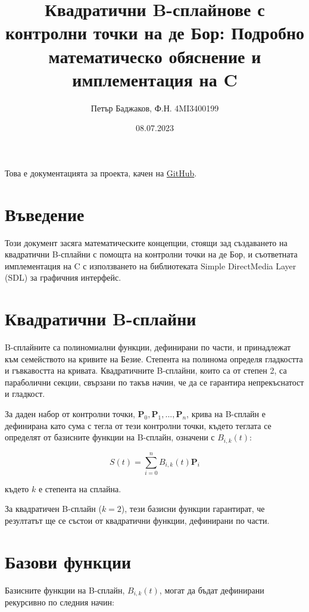 \documentclass{article}
\begin{document}
\title{Квадратични B-сплайнове с контролни точки на де Бор: Подробно математическо обяснение и имплементация на C}
\author{Петър Баджаков, Ф.Н. 4MI3400199}
\date{08.07.2023}
\maketitle

Това е документацията за проекта, качен на \href{https://github.com/PeterBadzhakov/GeometricAlgorithms/}{GitHub}.

\section{Въведение}
Този документ засяга математическите концепции, стоящи зад създаването на квадратични B-сплайни с помощта на контролни точки на де Бор, и съответната имплементация на C с използването на библиотеката Simple DirectMedia Layer (SDL) за графичния интерфейс.

\section{Квадратични B-сплайни}
B-сплайните са полиномиални функции, дефинирани по части, и принадлежат към семейството на кривите на Безие. Степента на полинома определя гладкостта и гъвкавостта на кривата. Квадратичните B-сплайни, които са от степен 2, са параболични секции, свързани по такъв начин, че да се гарантира непрекъснатост и гладкост.

За даден набор от контролни точки, $\mathbf{P}_0, \mathbf{P}_1, ..., \mathbf{P}_{n}$, крива на B-сплайн е дефинирана като сума с тегла от тези контролни точки, където теглата се определят от базисните функции на B-сплайн, означени с $B_{i,k}(t)$:

\begin{equation}
S(t) = \sum_{i=0}^{n} B_{i,k}(t) \mathbf{P}_i
\end{equation}

където $k$ е степента на сплайна.

За квадратичен B-сплайн ($k=2$), тези базисни функции гарантират, че резултатът ще се състои от квадратични функции, дефинирани по части.

\section{Базови функции}
Базисните функции на B-сплайн, $B_{i,k}(t)$, могат да бъдат дефинирани рекурсивно по следния начин:
\end{document}
